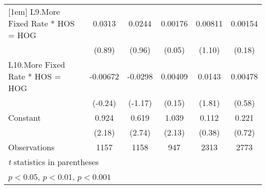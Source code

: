 {\begin{longtable}{l*{5}{c}}
[1em]
L9.More Fixed Rate * HOS = HOG&   0.0313         &   0.0244         &  0.00176         &  0.00811         &  0.00154         \\
                &   (0.89)         &   (0.96)         &   (0.05)         &   (1.10)         &   (0.18)         \\
[1em]
L10.More Fixed Rate * HOS = HOG& -0.00672         &  -0.0298         &  0.00409         &   0.0143         &  0.00478         \\
                &  (-0.24)         &  (-1.17)         &   (0.15)         &   (1.81)         &   (0.58)         \\
[1em]
Constant        &    0.924\sym{*}  &    0.619\sym{**} &    1.039\sym{*}  &    0.112         &    0.221         \\
                &   (2.18)         &   (2.74)         &   (2.13)         &   (0.38)         &   (0.72)         \\
\hline
Observations    &     1157         &     1158         &      947         &     2313         &     2773         \\
\hline\hline
\multicolumn{6}{l}{\footnotesize \textit{t} statistics in parentheses}\\
\multicolumn{6}{l}{\footnotesize \sym{*} \(p<0.05\), \sym{**} \(p<0.01\), \sym{***} \(p<0.001\)}\\
\end{longtable}
}
